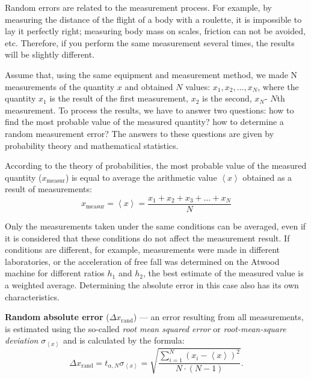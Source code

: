 \documentclass{LabWorkEng}
\begin{document}
Random errors are related to the measurement process. For example, by measuring the distance of the flight of a body with a roulette, it is impossible to lay it perfectly right; measuring body mass on scales, friction can not be avoided, etc. Therefore, if you perform the same measurement several times, the results will be slightly different.

Assume that, using the same equipment and measurement method, we made N measurements of the quantity $x$ and obtained $N$ values: $x_1, x_2, \ldots , x_N$, where the quantity $x_1$ is the result of the first measurement, $x_2$ is the second, $x_N$- $N$th measurement. To process the results, we have to answer two questions: how to find the most probable value of the measured quantity? how to determine a random measurement error? The answers to these questions are given by probability theory and mathematical statistics.

According to the theory of probabilities, the most probable value of the measured quantity ($x_\mathrm{measur}$) is equal to average the arithmetic value $\left\langle x \right\rangle $  obtained as a result of measurements:
\begin{equation}\label{average}
	x_\mathrm{measur} = \left\langle x \right\rangle = \frac{{{x_1} + {x_2} + {x_3} + \ldots + {x_N}}}{N}
\end{equation}

\noindent%
\begin{More}
	Only the measurements taken under the same conditions can be averaged, even if it is considered that these conditions do not affect the measurement result. If conditions are different, for example, measurements were made in different laboratories, or the acceleration of free fall was determined on the Atwood machine for different ratios $h_1$ and $h_2$, the best estimate of the measured value is a weighted average. Determining the absolute error in this case also has its own characteristics.
\end{More}

\textbf{Random absolute error} ($\Delta x_\mathrm{rand}$) --- an error resulting from all measurements, is estimated using the so-called \textit{root mean squared error} or \textit{root-mean-square deviation} $\sigma_{\left\langle x \right\rangle}$ and is calculated by the formula:
\begin{equation}\label{rae}
	\Delta x_\mathrm{rand} = t_{\alpha, N} \sigma_{\left\langle x \right\rangle} = \sqrt {\frac{{\sum\limits_{i = 1}^N {{{\left( {{x_i} - \left\langle x \right\rangle} \right)}^2}} }}{{N \cdot \left( {N - 1} \right)}}} .
\end{equation}
\end{document}
